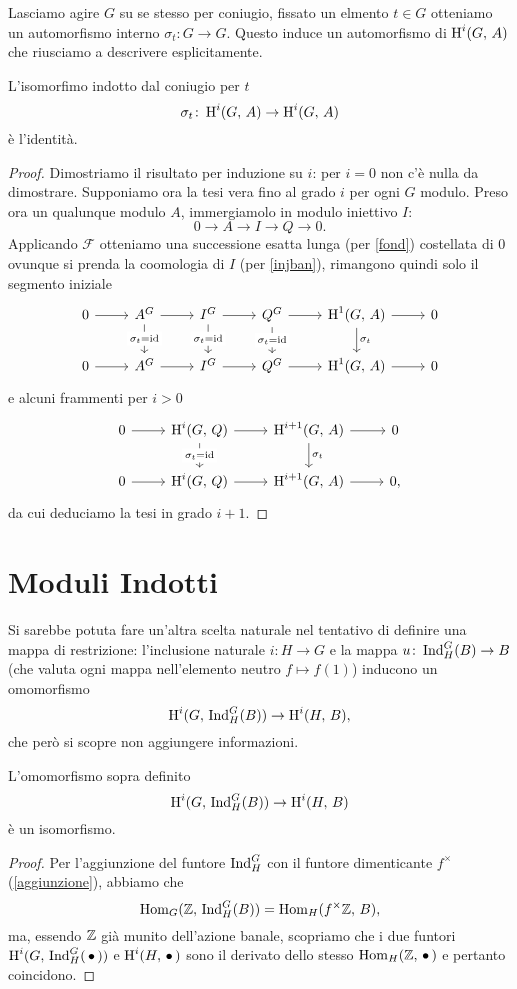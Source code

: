 Lasciamo agire $ G $ su se stesso per coniugio, fissato un elmento $ t \in G $ otteniamo un automorfismo interno $ \sigma_t \colon G \to G $. Questo induce un automorfismo di $ \operatorname{H}^i(G, \, A) $ che riusciamo a descrivere esplicitamente.

\begin{proposition}
	L'isomorfimo indotto dal coniugio per $ t $
	\[ \sigma_t \colon \operatorname{H}^i(G, \, A) \to \operatorname{H}^i(G, \, A) \]
	è l'identità.
\end{proposition}
\begin{proof}
	Dimostriamo il risultato per induzione su $ i $: per $ i = 0 $ non c'è nulla da dimostrare. Supponiamo ora la tesi vera fino al grado $ i $ per ogni $ G $ modulo. Preso ora un qualunque modulo $ A $, immergiamolo in modulo iniettivo $ I $:
	\[ 0 \to A \to I \to Q \to 0. \]
	Applicando $ \mathcal{F} $ otteniamo una successione esatta lunga (per \ref{fond}) costellata di $ 0 $ ovunque si prenda la coomologia di $ I $ (per \ref{injban}), rimangono quindi solo il segmento iniziale
	\[\begin{tikzcd}
	0 \rar & A^G \rar\dar["\sigma_t = \id" description] & I^G \rar\dar["\sigma_t = \id" description] & Q^G \rar\dar["\sigma_t = \id" description] & \HH^1(G, \, A) \rar\dar["\sigma_t"] & 0 \\
	0 \rar & A^G \rar & I^G \rar & Q^G \rar & \HH^1(G, \, A) \rar & 0
	\end{tikzcd}\]
	e alcuni frammenti per $ i > 0 $
	\[\begin{tikzcd}
	0 \rar & \HH^i(G, \, Q) \rar\dar["\sigma_t = \id" description] & \HH^{i+1}(G, \, A) \rar\dar["\sigma_t"] & 0 \\
	0 \rar & \HH^i(G, \, Q) \rar & \HH^{i+1}(G, \, A) \rar & 0,
	\end{tikzcd}\]
	da cui deduciamo la tesi in grado $ i+1 $.
\end{proof}

\section{Moduli Indotti}
Si sarebbe potuta fare un'altra scelta naturale nel tentativo di definire una mappa di restrizione: l'inclusione naturale $ i \colon H \to G $ e la mappa $ u \colon \operatorname{Ind}_H^G(B) \to B $ (che valuta ogni mappa nell'elemento neutro $ f \mapsto f(1) $) inducono un omomorfismo \[ \operatorname{H}^i(G, \, \operatorname{Ind}_H^G(B)) \to \operatorname{H}^i(H, \, B), \]
che però si scopre non aggiungere informazioni.

\begin{lemma}[di Shapiro] \label{Shapiro}
	L'omomorfismo sopra definito
	\[ \operatorname{H}^i(G, \, \operatorname{Ind}_H^G(B)) \to \operatorname{H}^i(H, \, B) \]
	è un isomorfismo.
\end{lemma}
\begin{proof}
	Per l'aggiunzione del funtore $ \operatorname{Ind}_H^G $ con il funtore dimenticante $ f^\times $ (\ref{aggiunzione}), abbiamo che
	\[ \operatorname{Hom}_G(\mathbb{Z},\, \operatorname{Ind}_H^G(B)) = \operatorname{Hom}_H(f^\times \mathbb{Z}, \, B), \]
	ma, essendo $ \mathbb{Z} $ già munito dell'azione banale, scopriamo che i due funtori $ \operatorname{H}^i(G, \, \operatorname{Ind}_H^G(\,\bullet\,)) $ e $ \operatorname{H}^i(H, \, \bullet\,) $ sono il derivato dello stesso $ \operatorname{Hom}_H(\mathbb{Z}, \,\bullet \,) $ e pertanto coincidono.
\end{proof}

